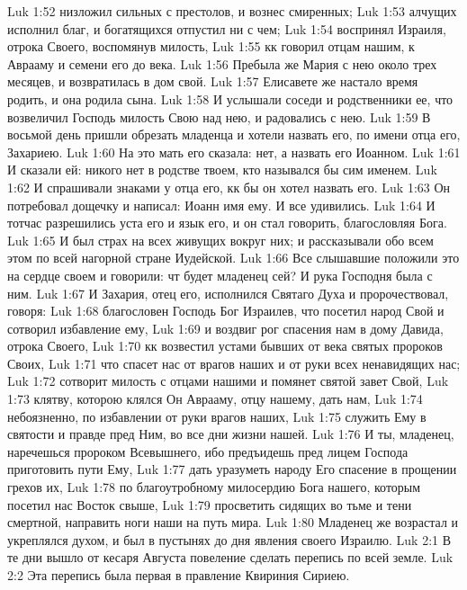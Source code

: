 \vs Luk 1:52 низложил сильных с престолов, и вознес смиренных;
\vs Luk 1:53 алчущих исполнил благ, и богатящихся отпустил ни с чем;
\vs Luk 1:54 воспринял Израиля, отрока Своего, воспомянув милость,
\vs Luk 1:55 кк говорил отцам нашим, к Аврааму и семени его до века.
\vs Luk 1:56 Пребыла же Мария с нею около трех месяцев, и возвратилась в дом свой.
\rsbpar\vs Luk 1:57 Елисавете же настало время родить, и она родила сына.
\vs Luk 1:58 И услышали соседи и родственники ее, что возвеличил Господь милость Свою над нею, и радовались с нею.
\vs Luk 1:59 В восьмой день пришли обрезать младенца и хотели назвать его, по имени отца его, Захариею.
\vs Luk 1:60 На это мать его сказала: нет, а назвать его Иоанном.
\vs Luk 1:61 И сказали ей: никого нет в родстве твоем, кто назывался бы сим именем.
\vs Luk 1:62 И спрашивали знаками у отца его, кк бы он хотел назвать его.
\vs Luk 1:63 Он потребовал дощечку и написал: Иоанн имя ему. И все удивились.
\vs Luk 1:64 И тотчас разрешились уста его и язык его, и он стал говорить, благословляя Бога.
\vs Luk 1:65 И был страх на всех живущих вокруг них; и рассказывали обо всем этом по всей нагорной стране Иудейской.
\vs Luk 1:66 Все слышавшие положили это на сердце своем и говорили: чт будет младенец сей? И рука Господня была с ним.
\vs Luk 1:67 И Захария, отец его, исполнился Святаго Духа и пророчествовал, говоря:
\vs Luk 1:68 благословен Господь Бог Израилев, что посетил народ Свой и сотворил избавление ему,
\vs Luk 1:69 и воздвиг рог спасения нам в дому Давида, отрока Своего,
\vs Luk 1:70 кк возвестил устами бывших от века святых пророков Своих,
\vs Luk 1:71 что спасет нас от врагов наших и от руки всех ненавидящих нас;
\vs Luk 1:72 сотворит милость с отцами нашими и помянет святой завет Свой,
\vs Luk 1:73 клятву, которою клялся Он Аврааму, отцу нашему, дать нам,
\vs Luk 1:74 небоязненно, по избавлении от руки врагов наших,
\vs Luk 1:75 служить Ему в святости и правде пред Ним, во все дни жизни нашей.
\vs Luk 1:76 И ты, младенец, наречешься пророком Всевышнего, ибо предъидешь пред лицем Господа приготовить пути Ему,
\vs Luk 1:77 дать уразуметь народу Его спасение в прощении грехов их,
\vs Luk 1:78 по благоутробному милосердию Бога нашего, которым посетил нас Восток свыше,
\vs Luk 1:79 просветить сидящих во тьме и тени смертной, направить ноги наши на путь мира.
\rsbpar\vs Luk 1:80 Младенец же возрастал и укреплялся духом, и был в пустынях до дня явления своего Израилю.
\vs Luk 2:1 В те дни вышло от кесаря Августа повеление сделать перепись по всей земле.
\vs Luk 2:2 Эта перепись была первая в правление Квириния Сириею.
